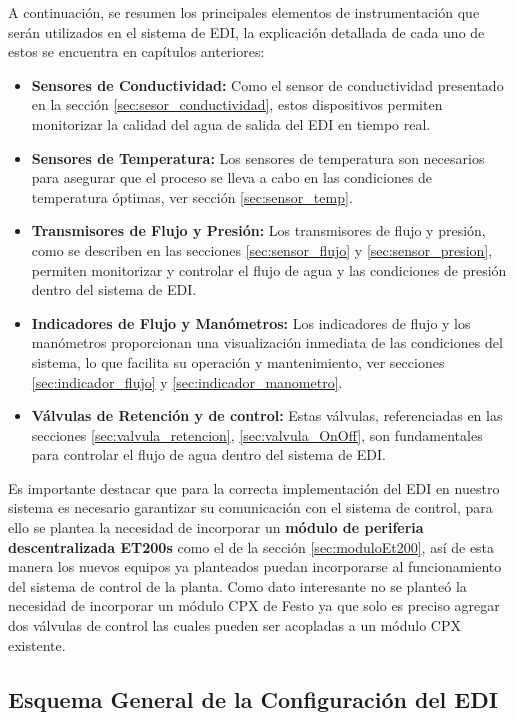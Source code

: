 A continuación, se resumen los principales elementos de instrumentación que serán utilizados en el sistema de EDI, la explicación detallada de cada uno de estos se encuentra en capítulos anteriores:
\begin{itemize}
      \item \textbf{Sensores de Conductividad:} Como el sensor de conductividad presentado en la sección \ref{sec:sesor_conductividad}, estos dispositivos permiten monitorizar la calidad del agua de salida del EDI en tiempo real.

      \item \textbf{Sensores de Temperatura:} Los sensores de temperatura son necesarios para asegurar que el proceso se lleva a cabo en las condiciones de temperatura óptimas, ver sección \ref{sec:sensor_temp}.

      \item \textbf{Transmisores de Flujo y Presión:} Los transmisores de flujo y presión, como se describen en las secciones \ref{sec:sensor_flujo} y \ref{sec:sensor_presion}, permiten monitorizar y controlar el flujo de agua y las condiciones de presión dentro del sistema de EDI.

      \item \textbf{Indicadores de Flujo y Manómetros:} Los indicadores de flujo y los manómetros proporcionan una visualización inmediata de las condiciones del sistema, lo que facilita su operación y mantenimiento, ver secciones \ref{sec:indicador_flujo} y \ref{sec:indicador_manometro}.

      \item \textbf{Válvulas de Retención y de control:} Estas válvulas, referenciadas en las secciones  \ref{sec:valvula_retencion}, \ref{sec:valvula_OnOff}, son fundamentales para controlar el flujo de agua dentro del sistema de EDI.
\end{itemize}
Es importante destacar que para la correcta implementación del EDI en nuestro sistema es necesario garantizar su comunicación con el sistema de control,
para ello se plantea la necesidad de incorporar un \textbf{módulo  de periferia descentralizada ET200s} como el de la sección \ref{sec:moduloEt200}, así de esta manera
los nuevos equipos ya planteados puedan incorporarse al funcionamiento del sistema de control de la planta. Como dato interesante no se planteó la necesidad de incorporar
un módulo CPX de Festo ya que solo es preciso agregar dos válvulas de control las cuales pueden ser acopladas a un módulo CPX existente.
 
\subsection{Esquema General de la Configuración del EDI}

